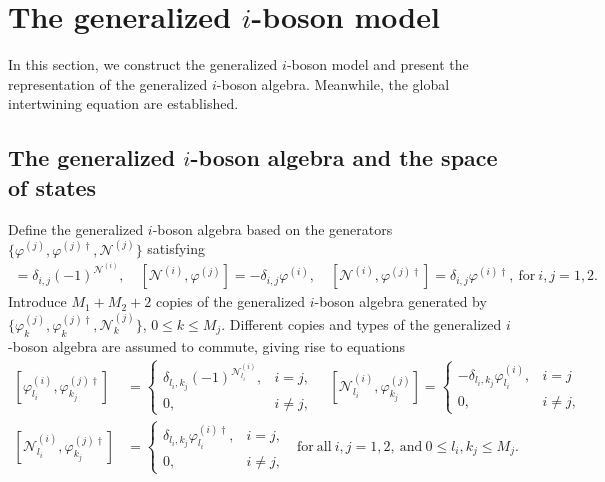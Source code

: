 \documentclass[11pt,reqno]{amsart}
\numberwithin{equation}{section}
\begin{document}
\section{The   generalized $i$-boson model}
In this section, we construct the   generalized $i$-boson model and present
the representation of the  generalized $i$-boson algebra. Meanwhile, the global intertwining equation are established.
	\subsection{The  generalized $i$-boson algebra and the space of states}
Define  the   generalized $i$-boson algebra based on the generators $\{\varphi^{(j)},\varphi^{(j)\dagger}, \mathcal{N}^{(j)}\}$ satisfying
\begin{align}
	[\varphi^{(i)},\varphi^{(j)\dagger}] =\delta_{i,j} (-1)^{\mathcal{N}^{(i)}}, \quad [\mathcal{N}^{(i)},\varphi^{(j)}] = -\delta_{i,j}\varphi^{(i)}, \quad [\mathcal{N}^{(i)},\varphi^{(j)\dagger}] =\delta_{i,j}\varphi^{(i)\dagger},\mathrm{~for~}i,j=1,2.
\end{align}
Introduce $M_{1}+M_{2}+2$ copies of the    generalized $i$-boson algebra generated by $\{\varphi_k^{(j)},\varphi_k^{(j)\dagger}, \mathcal{N}_k^{(j)}\}$, $0\leq k\leq M_j$.
Different copies and types of the    generalized $i$-boson algebra are assumed to commute, giving rise to  equations
\begin{align}\label{generalized-calculate}
	[\varphi_{l_{i}}^{(i)},\varphi_{k_{j}}^{(j)\dagger}]&=
	\left\{\begin{array}{ll}
		\delta_{l_{i},k_{j}}(-1)^{\mathcal{N}_{l_{i}}^{(i)}}, &  i=j,
		\\  0,&  i \neq j,
	\end{array}
	\right.	
	\quad	
	[\mathcal{N}_{l_{i}}^{(i)},\varphi_{k_{j}}^{(j)}]=
	\left\{\begin{array}{ll}
		-\delta_{l_{i},k_{j}}\varphi_{l_{i}}^{(i)}, &  i=j
		\\  0,&  i \neq j,
	\end{array}
	\right.
	\\
	[\mathcal{N}_{l_{i}}^{(i)},\varphi_{k_{j}}^{(j)\dagger}]&=
	\left\{\begin{array}{ll}
		\delta_{l_{i},k_{j}}\varphi_{l_{i}}^{(i)\dagger}, &  i=j,
		\\  0,&  i \neq j,
	\end{array}
	\right.
	\ \  \mathrm{~for~all~} i,j=1,2,  \mathrm{~and~}   0 \leq l_{i},k_{j} \leq M_j.
\end{align}
\end{document}
